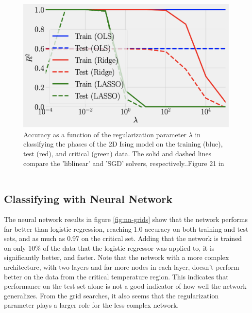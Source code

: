\begin{figure}[H]
\includegraphics[width = 0.6\paperwidth]{figures/R2_article.png}
\caption{Accuracy as a function of the regularization parameter
\(\lambda\) in classifying the phases of the 2D Ising model on the
training (blue), test (red), and critical (green) data. The solid
and dashed lines compare the ’liblinear’ and ’SGD’ solvers, respectively..Figure 21 in ~\cite{HighBias}} 
\label{fig:logistic-article}
\end{figure}


\subsection{Classifying with Neural Network}
The neural network results in figure \ref{fig:nn-grids} show that the network
performs far better than logistic regression, reaching 1.0 accuracy on both training and
test sets, and as much as 0.97 on the critical set. Adding that the network is trained
on only 10\% of the data that the logistic regressor was applied to, it is significantly better,
and faster.
Note that the network with a more complex architecture, with two layers and far more nodes in 
each layer, doesn't perform better on the data from the critical temperature region. 
This indicates that performance on the test set alone is not a good indicator of how well
the network generalizes. From the grid searches, it also seems that the regularization
parameter plays a larger role for the less complex network.


